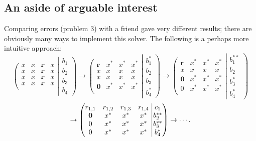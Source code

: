 \documentclass[11pt]{amsart}
\theoremstyle{definition}
\numberwithin{equation}{section}
\begin{document}
\subsection*{An aside of arguable interest}Comparing errors (problem 3) with a friend gave very different results; there are obviously many ways to implement this solver. The following is a perhaps more intuitive approach:
\begin{equation*}\left(
\begin{matrix}
x&x&x&x \\
x&x&x&x \\
x&x&x&x \\
x&x&x&x \\
\end{matrix}
\right.
\left|
\begin{matrix}
b_1 \\
b_2 \\
b_3 \\
b_4
\end{matrix}
\right)
\rightarrow
\left(
\begin{matrix}
\mathbf{r}&x^*&x^*&x^* \\
x&x&x&x \\
x&x&x&x \\
\mathbf{0}&x^*&x^*&x^* \\
\end{matrix}
\right.
\left|
\begin{matrix}
b_1^* \\
b_2 \\
b_3 \\
b_4^*
\end{matrix}
\right)
\rightarrow
\left(
\begin{matrix}
\mathbf{r}&x^*&x^*&x^* \\
x&x&x&x \\
\mathbf{0}&x^{*}&x^{*}&x^{*}\\
0&x^*&x^*&x^* \\
\end{matrix}
\right.
\left|
\begin{matrix}
b_1^{**} \\
b_2 \\
b_3^* \\
b_4^*
\end{matrix}
\right)
\end{equation*}
\begin{equation*}
\rightarrow
\left(
\begin{matrix}
r_{1,1}&r_{1,2}&r_{1,3}&r_{1,4} \\
\mathbf{0}&x^*&x^*&x^* \\
0&x^*&x^*&x^*\\
0&x^*&x^*&x^* \\
\end{matrix}
\right.
\left|
\begin{matrix}
c_1 \\
b_2^{**} \\
b_3^{**} \\
b_4^*
\end{matrix}
\right)
\rightarrow \cdots\\.
\end{equation*}
\end{document}
